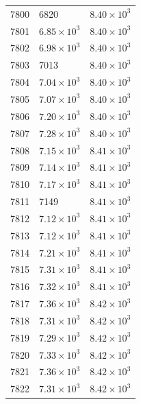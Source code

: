 \begin{table}[H]
\begin{tabular}{lll}
7800 & 6820 & $\displaystyle 8.40 \times 10^{3}$ \\
7801 & $\displaystyle 6.85 \times 10^{3}$ & $\displaystyle 8.40 \times 10^{3}$ \\
7802 & $\displaystyle 6.98 \times 10^{3}$ & $\displaystyle 8.40 \times 10^{3}$ \\
7803 & 7013 & $\displaystyle 8.40 \times 10^{3}$ \\
7804 & $\displaystyle 7.04 \times 10^{3}$ & $\displaystyle 8.40 \times 10^{3}$ \\
7805 & $\displaystyle 7.07 \times 10^{3}$ & $\displaystyle 8.40 \times 10^{3}$ \\
7806 & $\displaystyle 7.20 \times 10^{3}$ & $\displaystyle 8.40 \times 10^{3}$ \\
7807 & $\displaystyle 7.28 \times 10^{3}$ & $\displaystyle 8.40 \times 10^{3}$ \\
7808 & $\displaystyle 7.15 \times 10^{3}$ & $\displaystyle 8.41 \times 10^{3}$ \\
7809 & $\displaystyle 7.14 \times 10^{3}$ & $\displaystyle 8.41 \times 10^{3}$ \\
7810 & $\displaystyle 7.17 \times 10^{3}$ & $\displaystyle 8.41 \times 10^{3}$ \\
7811 & 7149 & $\displaystyle 8.41 \times 10^{3}$ \\
7812 & $\displaystyle 7.12 \times 10^{3}$ & $\displaystyle 8.41 \times 10^{3}$ \\
7813 & $\displaystyle 7.12 \times 10^{3}$ & $\displaystyle 8.41 \times 10^{3}$ \\
7814 & $\displaystyle 7.21 \times 10^{3}$ & $\displaystyle 8.41 \times 10^{3}$ \\
7815 & $\displaystyle 7.31 \times 10^{3}$ & $\displaystyle 8.41 \times 10^{3}$ \\
7816 & $\displaystyle 7.32 \times 10^{3}$ & $\displaystyle 8.41 \times 10^{3}$ \\
7817 & $\displaystyle 7.36 \times 10^{3}$ & $\displaystyle 8.42 \times 10^{3}$ \\
7818 & $\displaystyle 7.31 \times 10^{3}$ & $\displaystyle 8.42 \times 10^{3}$ \\
7819 & $\displaystyle 7.29 \times 10^{3}$ & $\displaystyle 8.42 \times 10^{3}$ \\
7820 & $\displaystyle 7.33 \times 10^{3}$ & $\displaystyle 8.42 \times 10^{3}$ \\
7821 & $\displaystyle 7.36 \times 10^{3}$ & $\displaystyle 8.42 \times 10^{3}$ \\
7822 & $\displaystyle 7.31 \times 10^{3}$ & $\displaystyle 8.42 \times 10^{3}$ \\

\end{tabular}
\end{table}
